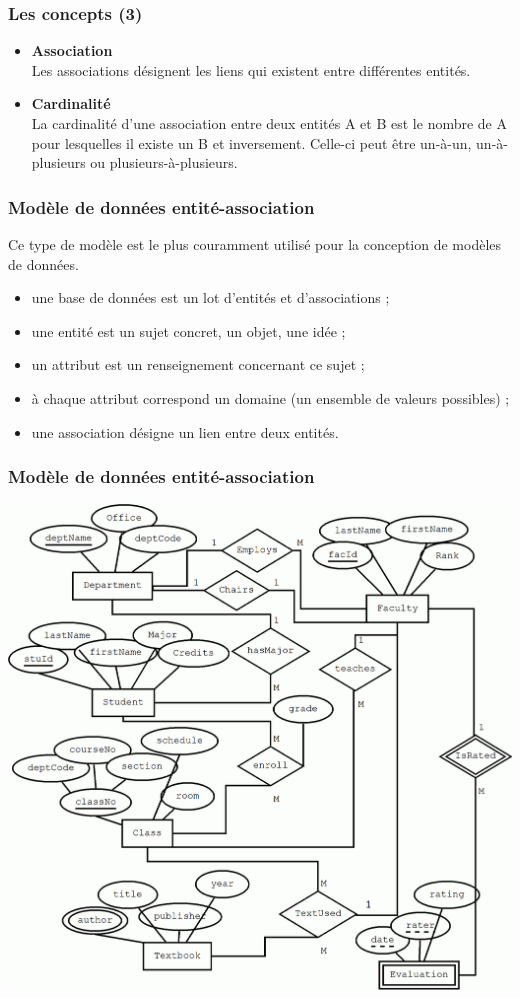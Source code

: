 \begin{frame}
    \frametitle{Les concepts (3)}
    \begin{itemize}
        \item \textbf{Association}\\
        Les associations désignent les liens qui existent entre différentes entités.
        \item \textbf{Cardinalité}\\
        La cardinalité d'une association entre deux entités A et B
        est le nombre de A pour lesquelles il existe un B et inversement.
        Celle-ci peut être un-à-un, un-à-plusieurs ou plusieurs-à-plusieurs.
    \end{itemize}
\end{frame}

\begin{frame}
    \frametitle{Modèle de données entité-association}

    Ce type de modèle est le plus couramment utilisé pour la conception de modèles de données.
    \begin{itemize}
        \item une base de données est un lot d'entités et d'associations ;
        \item une entité est un sujet concret, un objet, une idée ;
        \item un attribut est un renseignement concernant ce sujet ;
        \item à chaque attribut correspond un domaine (un ensemble de valeurs possibles) ;
        \item une association désigne un lien entre deux entités.
    \end{itemize}
\end{frame}

\begin{frame}
    \frametitle{Modèle de données entité-association}

    \centering
    \includegraphics[width=0.5\linewidth]{figures/persistence/modèle-entité-association}
\end{frame}

